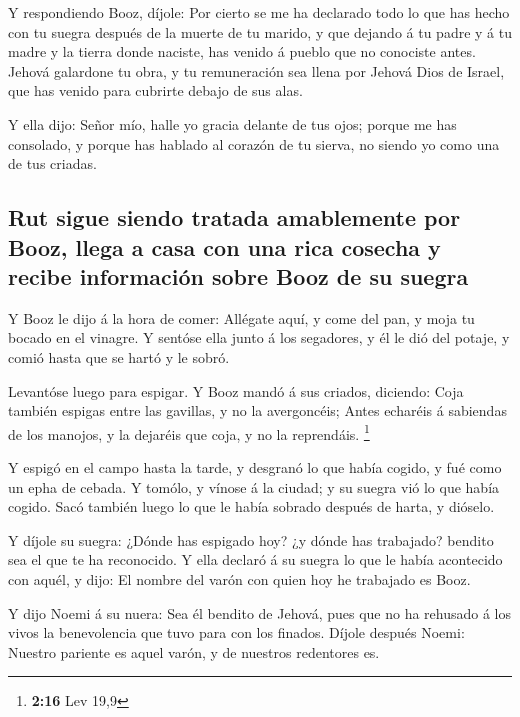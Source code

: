  Y respondiendo Booz, díjole: Por cierto se me ha
declarado todo lo que has hecho con tu suegra después de la muerte de tu
marido, y que dejando á tu padre y á tu madre y la tierra donde naciste,
has venido á pueblo que no conociste antes.  Jehová
galardone tu obra, y tu remuneración sea llena por Jehová Dios de
Israel, que has venido para cubrirte debajo de sus alas.

 Y ella dijo: Señor mío, halle yo gracia delante de tus
ojos; porque me has consolado, y porque has hablado al corazón de tu
sierva, no siendo yo como una de tus criadas.

\hypertarget{rut-sigue-siendo-tratada-amablemente-por-booz-llega-a-casa-con-una-rica-cosecha-y-recibe-informaciuxf3n-sobre-booz-de-su-suegra}{%
\subsection{Rut sigue siendo tratada amablemente por Booz, llega a casa
con una rica cosecha y recibe información sobre Booz de su
suegra}\label{rut-sigue-siendo-tratada-amablemente-por-booz-llega-a-casa-con-una-rica-cosecha-y-recibe-informaciuxf3n-sobre-booz-de-su-suegra}}

 Y Booz le dijo á la hora de comer: Allégate aquí, y come
del pan, y moja tu bocado en el vinagre. Y sentóse ella junto á los
segadores, y él le dió del potaje, y comió hasta que se hartó y le
sobró.

 Levantóse luego para espigar. Y Booz mandó á sus
criados, diciendo: Coja también espigas entre las gavillas, y no la
avergoncéis;  Antes echaréis á sabiendas de los manojos,
y la dejaréis que coja, y no la reprendáis. \footnote{\textbf{2:16} Lev
  19,9}

 Y espigó en el campo hasta la tarde, y desgranó lo que
había cogido, y fué como un epha de cebada.  Y tomólo, y
vínose á la ciudad; y su suegra vió lo que había cogido. Sacó también
luego lo que le había sobrado después de harta, y dióselo.

 Y díjole su suegra: ¿Dónde has espigado hoy? ¿y dónde
has trabajado? bendito sea el que te ha reconocido. Y ella declaró á su
suegra lo que le había acontecido con aquél, y dijo: El nombre del varón
con quien hoy he trabajado es Booz.

 Y dijo Noemi á su nuera: Sea él bendito de Jehová, pues
que no ha rehusado á los vivos la benevolencia que tuvo para con los
finados. Díjole después Noemi: Nuestro pariente es aquel varón, y de
nuestros redentores es.

